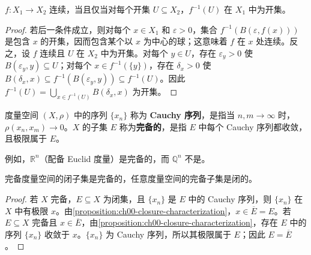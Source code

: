 \documentclass[../../main.tex]{subfiles}%
\begin{document}
\begin{proposition}\label{proposition:ch00-continuity-open-preimages}
$f:X_1\to X_2$ 连续，当且仅当对每个开集 $U\subseteq X_2$，$f^{-1}(U)$ 在 $X_1$ 中为开集。
\end{proposition}

\begin{proof}
若后一条件成立，则对每个 $x\in X_1$ 和 $\varepsilon>0$，集合 $f^{-1}(B(\varepsilon,f(x)))$ 是包含 $x$ 的开集，因而包含某个以 $x$ 为中心的球；这意味着 $f$ 在 $x$ 处连续。反之，设 $f$ 连续且 $U$ 在 $X_2$ 中为开集。对每个 $y\in U$，存在 $\varepsilon_y>0$ 使 $B(\varepsilon_y,y)\subseteq U$；对每个 $x\in f^{-1}(\{y\})$，存在 $\delta_x>0$ 使 $B(\delta_x,x)\subseteq f^{-1}(B(\varepsilon_y,y))\subseteq f^{-1}(U)$。因此 $f^{-1}(U)=\bigcup_{x\in f^{-1}(U)}B(\delta_x,x)$ 为开集。
\end{proof}


\begin{definition}\label{definition:ch00-completeness-definition}
度量空间 $(X,\rho)$ 中的序列 $\{x_n\}$ 称为 \textbf{Cauchy 序列}，是指当 $n,m\to\infty$ 时，$\rho(x_n,x_m)\to0$。$X$ 的子集 $E$ 称为\textbf{完备的}，是指 $E$ 中每个 Cauchy 序列都收敛，且极限属于 $E$。
\end{definition}

\begin{example}\label{example:ch00-complete-space-example}
例如，$\mathbb{R}^n$（配备 Euclid 度量）是完备的，而 $\mathbb{Q}^n$ 不是。
\end{example}


\begin{proposition}\label{proposition:ch00-closed-complete}
完备度量空间的闭子集是完备的，任意度量空间的完备子集是闭的。
\end{proposition}

\begin{proof}
若 $X$ 完备，$E\subseteq X$ 为闭集，且 $\{x_n\}$ 是 $E$ 中的 Cauchy 序列，则 $\{x_n\}$ 在 $X$ 中有极限 $x$。由\cref{proposition:ch00-closure-characterization}，$x\in\overline{E}=E$。若 $E\subseteq X$ 完备且 $x\in\overline{E}$，由\cref{proposition:ch00-closure-characterization}，存在 $E$ 中的序列 $\{x_n\}$ 收敛于 $x$。$\{x_n\}$ 为 Cauchy 序列，所以其极限属于 $E$；因此 $E=\overline{E}$。
\end{proof}
\end{document}
